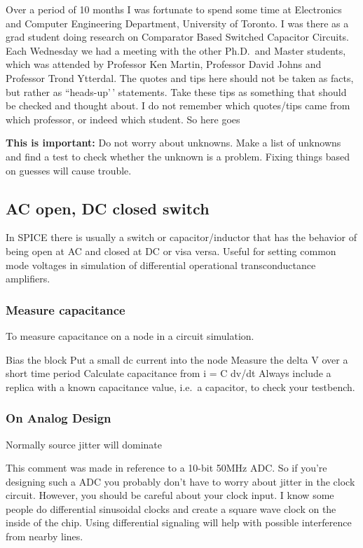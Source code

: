 Over a period of 10 months I was fortunate to spend some time at
Electronics and Computer Engineering Department, University of Toronto.
I was there as a grad student doing research on Comparator Based
Switched Capacitor Circuits. Each Wednesday we had a meeting with the
other Ph.D.~and Master students, which was attended by Professor Ken
Martin, Professor David Johns and Professor Trond Ytterdal. The quotes
and tips here should not be taken as facts, but rather as ``heads-up'\,'
statements. Take these tips as something that should be checked and
thought about. I do not remember which quotes/tips came from which
professor, or indeed which student. So here goes

\textbf{This is important:} Do not worry about unknowns. Make a list of
unknowns and find a test to check whether the unknown is a problem.
Fixing things based on guesses will cause trouble.

\subsection{AC open, DC closed switch}\label{ac-open-dc-closed-switch}

In SPICE there is usually a switch or capacitor/inductor that has the
behavior of being open at AC and closed at DC or visa versa. Useful for
setting common mode voltages in simulation of differential operational
transconductance amplifiers.

\subsubsection{Measure capacitance}\label{measure-capacitance}

To measure capacitance on a node in a circuit simulation.

Bias the block Put a small dc current into the node Measure the delta V
over a short time period Calculate capacitance from i = C dv/dt Always
include a replica with a known capacitance value, i.e.~a capacitor, to
check your testbench.

\subsubsection{On Analog Design}\label{on-analog-design}

Normally source jitter will dominate

This comment was made in reference to a 10-bit 50MHz ADC. So if you're
designing such a ADC you probably don't have to worry about jitter in
the clock circuit. However, you should be careful about your clock
input. I know some people do differential sinusoidal clocks and create a
square wave clock on the inside of the chip. Using differential
signaling will help with possible interference from nearby lines.


